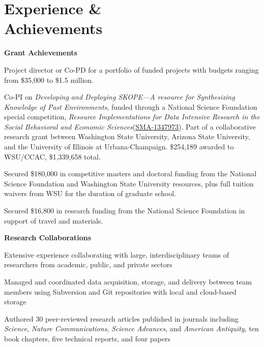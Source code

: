 \section{Experience \& \\ Achievements}


{\bf Grant Achievements}
\begin{bullet1}
\item Project director or Co-PD for a portfolio of funded projects with budgets ranging from \$35,000 to \$1.5 million.
\item Co-PI on \emph{Developing and Deploying SKOPE---A resource for Synthesizing Knowledge of Past Environments}, funded through a National Science Foundation special competition, \emph{Resource Implementations for Data Intensive Research in the Social Behavioral and Economic Sciences}(\href{http://www.nsf.gov/awardsearch/showAward?AWD_ID=1637171}{SMA-1347973}). Part of a collaborative research grant between Washington State University, Arizona State University, and the University of Illinois at Urbana-Champaign. \$254,189 awarded to WSU/CCAC, \$1,339,658 total.
\item Secured \$180,000 in competitive masters and doctoral funding from the National Science Foundation and Washington State University resources, plus full tuition waivers from WSU for the duration of graduate school.
\item Secured \$16,800 in research funding from the National Science Foundation in support of travel and materials.
\end{bullet1}


{\bf Research Collaborations}
\begin{bullet1}
\item Extensive experience collaborating with large, interdisciplinary teams of researchers from academic, public, and private sectors
\item Managed and coordinated data acquisition, storage, and delivery between team members using Subversion and Git repositories with local and cloud-based storage
\item Authored 30 peer-reviewed research articles published in journals including \emph{Science}, \emph{Nature Communications},  \emph{Science Advances}, and \emph{American Antiquity}, ten book chapters, five technical reports, and four  papers
\end{bullet1}


